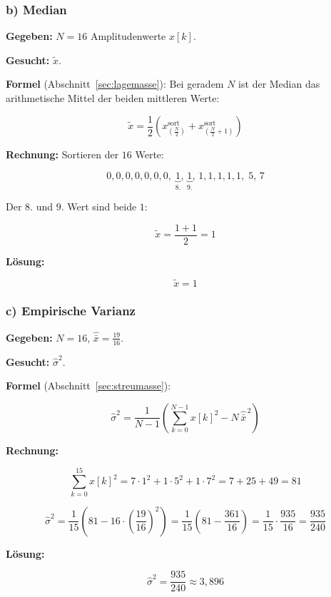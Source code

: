 \subsubsection*{b) Median}

\begin{beispiel}[Median]

\textbf{Gegeben:} $N = 16$ Amplitudenwerte $x[k]$.

\textbf{Gesucht:} $\tilde{x}$.

\textbf{Formel} (Abschnitt~\ref{sec:lagemasse}): Bei geradem $N$ ist der Median das
arithmetische Mittel der beiden mittleren Werte:

$$
\tilde{x} = \frac{1}{2}\left( x_{\left(\frac{N}{2}\right)}^{\text{sort}}
                              + x_{\left(\frac{N}{2}+1\right)}^{\text{sort}} \right)
$$

\textbf{Rechnung:} Sortieren der $16$ Werte:

$$
0,0,0,0,0,0,0,\; \underbrace{1}_{8.},\, \underbrace{1}_{9.},\, 1,1,1,1,1,\; 5,\, 7
$$

Der $8.$ und $9.$ Wert sind beide $1$:

$$
\tilde{x} = \frac{1 + 1}{2} = 1
$$

\textbf{Lösung:}

$$
\boxed{\;\tilde{x} = 1\;}
$$

\end{beispiel}

\subsubsection*{c) Empirische Varianz}

\begin{beispiel}

\textbf{Gegeben:} $N = 16$, $\hat{\bar{x}} = \tfrac{19}{16}$.

\textbf{Gesucht:} $\hat{\sigma}^2$.

\textbf{Formel} (Abschnitt~\ref{sec:streumasse}):

$$
\hat{\sigma}^2 = \frac{1}{N-1}\left( \sum_{k=0}^{N-1} x[k]^2 - N\,\hat{\bar{x}}^{\,2} \right)
$$

\textbf{Rechnung:}

$$
\sum_{k=0}^{15} x[k]^2 = 7\cdot 1^2 + 1\cdot 5^2 + 1\cdot 7^2 = 7 + 25 + 49 = 81
$$

$$
\hat{\sigma}^2 = \frac{1}{15}\left( 81 - 16\cdot\left(\frac{19}{16}\right)^2 \right)
= \frac{1}{15}\left( 81 - \frac{361}{16} \right)
= \frac{1}{15}\cdot \frac{935}{16}
= \frac{935}{240}
$$

\textbf{Lösung:}

$$
\boxed{\;\hat{\sigma}^2 = \frac{935}{240} \approx 3{,}896\;}
$$

\end{beispiel}

